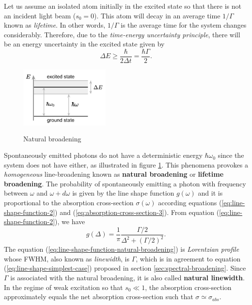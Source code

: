 {Let us assume an isolated atom initially in the excited state so that there is not an incident light beam ($ s_0 = 0 $). This atom will decay in an average time $ 1/\Gamma $ known as \textit{lifetime}. In other words, $ 1 / \Gamma $ is the average time for the system changes considerably. Therefore, due to the \textit{time-energy uncertainty principle}, there will be an energy uncertainty in the excited state given by
\begin{equation}
	\Delta E \geq \frac{\hbar}{2\Delta t} = \frac{\hbar\Gamma}{2}.
\end{equation}
\begin{figure}[!ht]
	\centering
	\vspace{0pt}
	\caption{Natural broadening}
	\includegraphics[width=0.4\textwidth]{USPSC-img/natural_broadening.png}
	\vspace{5pt}
	\vspace{-10pt}
	\label{fig:natural-broadening}
\end{figure}
Spontaneously emitted photons do not have a deterministic energy $ \hbar \omega_0 $ since the system does not have either, as illustrated in figure \ref{fig:natural-broadening}. This phenomena provokes a \textit{homogeneous} line-broadening known as \textbf{natural broadening} or \textbf{lifetime broadening}. The probability of spontaneously emitting a photon with frequency between $ \omega $ and $ \omega + d\omega $ is given by the line shape function $ g(\omega) $ and it is proportional to the absorption cross-section $ \sigma(\omega) $ according equations (\ref{eq:line-shape-function-2}) and (\ref{eq:absorption-cross-section-3}). From equation (\ref{eq:line-shape-function-2}), we have
\begin{equation}
	g(\Delta) = \frac{1}{\pi} \frac{\Gamma / 2}{\Delta^2 + (\Gamma / 2)^2}.
	\label{eq:line-shape-function-natural-broadening}
\end{equation}
The equation (\ref{eq:line-shape-function-natural-broadening}) is \textit{Lorentzian profile} whose FWHM, also known as \textit{linewidth}, is $ \Gamma $, which is in agreement to equation (\ref{eq:line-shape-simplest-case}) proposed in section \ref{sec:spectral-broadening}. Since $ \Gamma $ is associated with the natural broadening, it is also called \textbf{natural linewidth}. In the regime of weak excitation so that $ s_0 \ll 1 $, the absorption cross-section approximately equals the net absorption cross-section such that $ \sigma \simeq \sigma_{abs} $.
 
}
